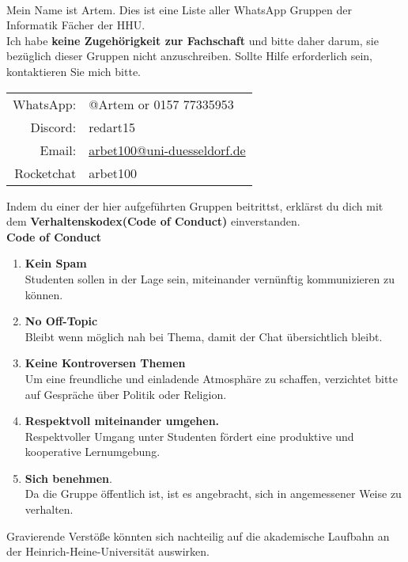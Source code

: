 \documentclass[a4paper,11pt]{article}
\newcommand{\header}[1]{%
    \fancyhead{}%
    \fancyhead[C]{\colorbox{headercolor}{\parbox{\dimexpr\textwidth-2\fboxsep}{\centering\textbf{WhatsApp Kontakte}}}}%
}
\newcommand{\fooder}[1]{
    \fancyfoot{}%
    \fancyfoot[C]{\colorbox{headercolor}{%
        \parbox{\dimexpr\textwidth-2\fboxsep}{%
            \centering%
            #1
            }%
        }%
    }%
}%
\newcommand{\fooder}[1]{
    \fancyfoot{}%
    \fancyfoot[C]{\colorbox{headercolor}{%
        \parbox{\dimexpr\textwidth-2\fboxsep}{%
            \centering%
            Infos
            }%
        }%
    }%
}%
\newcommand{\sectionstarInto}[1]{%
  \vspace{3cm}
  \section*{#1}
  \header{#1} %
  \phantomsection
  \addcontentsline{toc}{section}{#1}
  \fooder{#1}
}
\begin{document}
\let\oldclearpage\clearpage

\renewcommand{\clearpage}{}

\newpage
\noindent{}\\
Mein Name ist Artem. Dies ist eine Liste aller WhatsApp Gruppen der Informatik Fächer der HHU.\\
\noindent Ich habe \textbf{keine Zugehörigkeit zur Fachschaft} und bitte daher darum, sie bezüglich dieser Gruppen nicht anzuschreiben. Sollte Hilfe erforderlich sein, kontaktieren Sie mich bitte.

\begin{center}
\begin{tabular}{rl}
     WhatsApp: & @Artem or 0157 77335953\\
     Discord: & redart15\\
     Email: & \href{mailto:arbet100@uni-duesseldorf.de}{arbet100@uni-duesseldorf.de}\\
     Rocketchat & arbet100\\
\end{tabular}    
\end{center}

\noindent Indem du einer der hier aufgeführten Gruppen beitrittst, erklärst du dich mit dem \textbf{Verhaltenskodex(Code of Conduct)} einverstanden.
\\
\large{\textbf{Code of Conduct}}
\begin{enumerate}
    \item \textbf{Kein Spam}\\
    Studenten sollen in der Lage sein, miteinander vernünftig kommunizieren zu können.
    \item \textbf{No Off-Topic}\\
    Bleibt wenn möglich nah bei Thema, damit der Chat übersichtlich bleibt. 
    \item \textbf{Keine Kontroversen Themen}\\
    Um eine freundliche und einladende Atmosphäre zu schaffen, verzichtet bitte auf Gespräche über Politik oder Religion.
    \item \textbf{Respektvoll miteinander umgehen.}\\
    Respektvoller Umgang unter Studenten fördert eine produktive und kooperative Lernumgebung. 
    \item \textbf{Sich benehmen}.\\
    Da die Gruppe öffentlich ist, ist es angebracht, sich in angemessener Weise zu verhalten.
\end{enumerate}
Gravierende Verstöße könnten sich nachteilig auf die akademische Laufbahn an der Heinrich-Heine-Universität auswirken.
\end{document}
